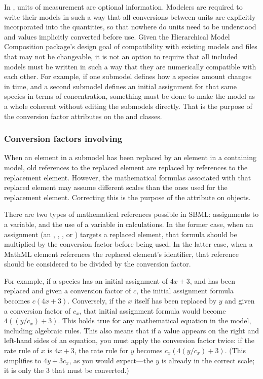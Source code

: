 In \sbmlthreecore, units of measurement are optional
information.  Modelers are required to write their models in such a way
that all conversions between units are explicitly incorporated into the
quantities, so that nowhere do units need to be understood and values
implicitly converted before use.  Given the Hierarchical Model
Composition package's design goal of compatibility with existing models
and files that may not be changeable, it is not an option to require
that all included models must be written in such a way that they are
numerically compatible with each other.  For example, if one submodel
defines how a species amount changes in time, and a second submodel
defines an initial assignment for that same species in terms of
concentration, something must be done to make the model as a whole
coherent without editing the submodels directly.  That is the purpose of
the conversion factor attributes on the \ReplacedElement and \Submodel
classes.


\subsubsection{Conversion factors involving }

When an element in a submodel has been replaced by an element in a
containing model, old references to the replaced element are replaced by
references to the replacement element.  However, the mathematical
formulas associated with that replaced element may assume different
scales than the ones used for the replacement element.  Correcting this
is the purpose of the  attribute on
\ReplacedElement objects.

There are two types of mathematical references possible in SBML:  assignments
to a variable, and the use of a variable in calculations.  In the former
case, when an assignment (an \InitialAssignment, \EventAssignment, \AssignmentRule,
or \RateRule) targets a replaced element, that formula should be 
multiplied by the conversion factor before being used.  In the latter
case, when a MathML  element references the replaced element's identifier, that
reference should be considered to be divided by the conversion factor.

For example, if a species has an initial assignment of $4x + 3$, and has
been replaced and given a conversion factor of $c$, the initial assignment formula becomes
$c (4x+3)$.  Conversely, if the $x$ itself has
been replaced by $y$ and given a conversion factor of $c_x$, that initial
assignment formula would become $4((y/c_x)+3)$.  This holds true for any
mathematical equation in the model, including algebraic rules.  This
also means that if a value appears on the right and left-hand sides of
an equation, you must apply the conversion factor twice: if the rate
rule of $x$ is $4x+3$, the rate rule for $y$ becomes $c_x(4(y/c_x) + 3)$.  (This
simplifies to $4y + 3c_x$, as you would expect---the $y$ is already in
the correct scale; it is only the $3$ that must be converted.)



